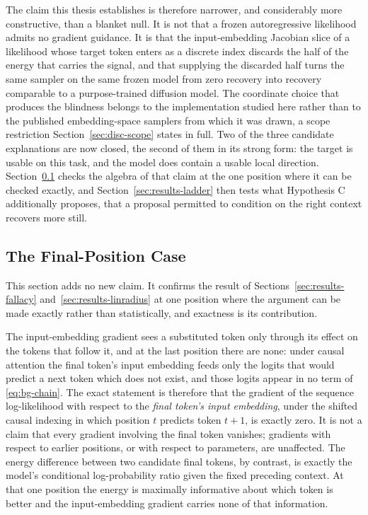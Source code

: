 The claim this thesis establishes is therefore narrower, and considerably more constructive, than a blanket null. It is not that a frozen autoregressive likelihood admits no gradient guidance. It is that the input-embedding Jacobian slice of a likelihood whose target token enters as a discrete index discards the half of the energy that carries the signal, and that supplying the discarded half turns the same sampler on the same frozen model from zero recovery into recovery comparable to a purpose-trained diffusion model. The coordinate choice that produces the blindness belongs to the implementation studied here rather than to the published embedding-space samplers from which it was drawn, a scope restriction Section~\ref{sec:disc-scope} states in full. Two of the three candidate explanations are now closed, the second of them in its strong form: the target is usable on this task, and the model does contain a usable local direction. Section~\ref{sec:results-lasttoken} checks the algebra of that claim at the one position where it can be checked exactly, and Section~\ref{sec:results-ladder} then tests what Hypothesis C additionally proposes, that a proposal permitted to condition on the right context recovers more still.

\subsection{The Final-Position Case}
\label{sec:results-lasttoken}

This section adds no new claim. It confirms the result of Sections~\ref{sec:results-fallacy} and~\ref{sec:results-linradius} at one position where the argument can be made exactly rather than statistically, and exactness is its contribution.

The input-embedding gradient sees a substituted token only through its effect on the tokens that follow it, and at the last position there are none: under causal attention the final token's input embedding feeds only the logits that would predict a next token which does not exist, and those logits appear in no term of \eqref{eq:bg-chain}. The exact statement is therefore that the gradient of the sequence log-likelihood with respect to the \emph{final token's input embedding}, under the shifted causal indexing in which position $t$ predicts token $t+1$, is exactly zero. It is not a claim that every gradient involving the final token vanishes; gradients with respect to earlier positions, or with respect to parameters, are unaffected. The energy difference between two candidate final tokens, by contrast, is exactly the model's conditional log-probability ratio given the fixed preceding context. At that one position the energy is maximally informative about which token is better and the input-embedding gradient carries none of that information.

